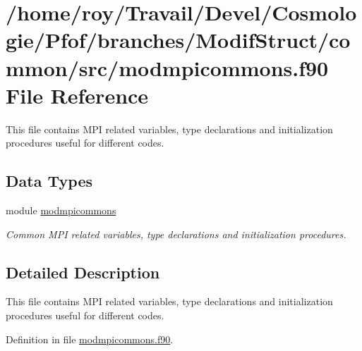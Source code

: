 \hypertarget{modmpicommons_8f90}{\section{/home/roy/\-Travail/\-Devel/\-Cosmologie/\-Pfof/branches/\-Modif\-Struct/common/src/modmpicommons.f90 File Reference}
\label{modmpicommons_8f90}
}


This file contains M\-P\-I related variables, type declarations and initialization procedures useful for different codes.  


\subsection*{Data Types}
\begin{DoxyCompactItemize}
\item 
module \hyperlink{classmodmpicommons}{modmpicommons}
\begin{DoxyCompactList}\small\item\em Common M\-P\-I related variables, type declarations and initialization procedures. \end{DoxyCompactList}\end{DoxyCompactItemize}


\subsection{Detailed Description}
This file contains M\-P\-I related variables, type declarations and initialization procedures useful for different codes. 

Definition in file \hyperlink{modmpicommons_8f90_source}{modmpicommons.\-f90}.

